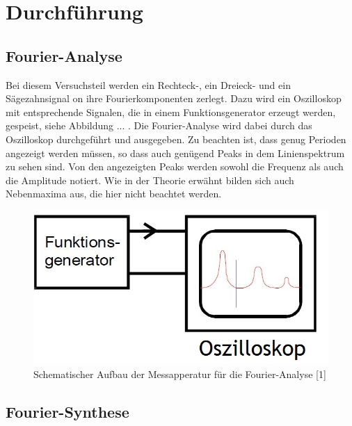 \section{Durchführung}
\label{sec:Durchführung}

\subsection{Fourier-Analyse}

Bei diesem Versuchsteil werden ein Rechteck-, ein Dreieck- und 
ein Sägezahnsignal on ihre Fourierkomponenten zerlegt. Dazu wird
ein Oszilloskop mit entsprechende Signalen, die in einem Funktionsgenerator 
erzeugt werden, gespeist, siehe Abbildung ... . 
Die Fourier-Analyse wird dabei durch das
Oszilloskop durchgeführt und ausgegeben. Zu beachten ist, dass genug
Perioden angezeigt werden müssen, so dass auch genügend Peaks in dem 
Linienspektrum zu sehen sind. Von den angezeigten Peaks werden sowohl
die Frequenz als auch die Amplitude notiert. Wie in der Theorie erwähnt
bilden sich auch Nebenmaxima aus, die hier nicht beachtet werden. 

\begin{figure}
  \centering
  \includegraphics[scale=0.2]{content/Aufbau_1.jpg}
  \caption{Schematischer Aufbau der Messapperatur für die Fourier-Analyse [1]}
  \label{fig:aufbau}
\end{figure}

\subsection{Fourier-Synthese}


